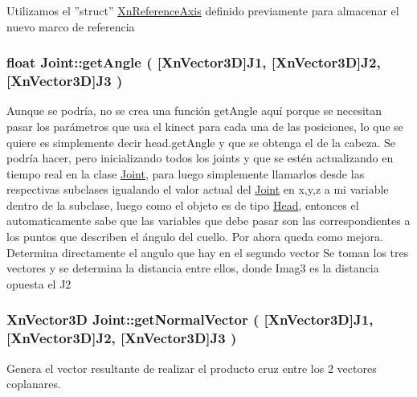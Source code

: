 \-Utilizamos el ''struct'' \hyperlink{struct_xn_reference_axis}{\-Xn\-Reference\-Axis} definido previamente para almacenar el nuevo marco de referencia \hypertarget{class_joint_a52f2f6003f4cff059847d959488622a1}{
\subsubsection[{get\-Angle}]{\setlength{\rightskip}{0pt plus 5cm}float {\bf \-Joint\-::get\-Angle} (
[{\-Xn\-Vector3\-D}]{\-J1, }
[{\-Xn\-Vector3\-D}]{\-J2, }
[{\-Xn\-Vector3\-D}]{\-J3}
)}}\label{class_joint_a52f2f6003f4cff059847d959488622a1}

\-Aunque se podría, no se crea una función get\-Angle aquí porque se necesitan pasar los parámetros que usa el kinect para cada una de las posiciones, lo que se quiere es simplemente decir head.\-get\-Angle y que se obtenga el de la cabeza. \-Se podría hacer, pero inicializando todos los joints y que se estén actualizando en tiempo real en la clase \hyperlink{class_joint}{\-Joint}, para luego simplemente llamarlos desde las respectivas subclases igualando el valor actual del \hyperlink{class_joint}{\-Joint} en x,y,z a mi variable dentro de la subclase, luego como el objeto es de tipo \hyperlink{class_head}{\-Head}, entonces el automaticamente sabe que las variables que debe pasar son las correspondientes a los puntos que describen el ángulo del cuello. \-Por ahora queda como mejora. \-Determina directamente el angulo que hay en el segundo vector \-Se toman los tres vectores y se determina la distancia entre ellos, donde \-Imag3 es la distancia opuesta el \-J2 \hypertarget{class_joint_ac59f570adbaf039bbe0f4173e5e7e2ce}{
\subsubsection[{get\-Normal\-Vector}]{\setlength{\rightskip}{0pt plus 5cm}\-Xn\-Vector3\-D {\bf \-Joint\-::get\-Normal\-Vector} (
[{\-Xn\-Vector3\-D}]{\-J1, }
[{\-Xn\-Vector3\-D}]{\-J2, }
[{\-Xn\-Vector3\-D}]{\-J3}
)}}\label{class_joint_ac59f570adbaf039bbe0f4173e5e7e2ce}


\-Genera el vector resultante de realizar el producto cruz entre los 2 vectores coplanares. 

